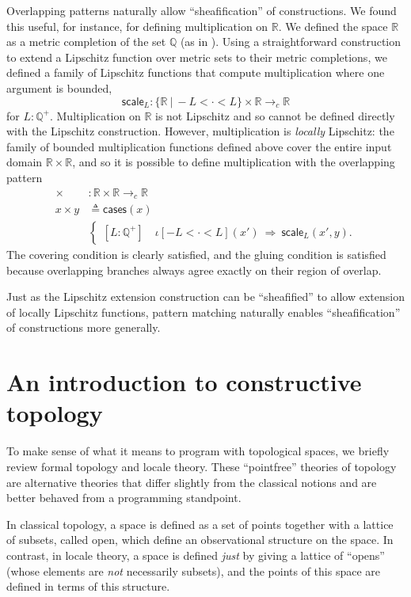 \documentclass[conference]{IEEEtran}
\newcommand{\cto}{\to_c}
\newcommand{\R}{\mathbb{R}}
\newcommand{\rat}{\mathbb{Q}}
\newcommand{\suchthat}{\ |\ }
\newcommand{\oinclf}[1]{\iota[{#1}]}
\newcommand{\oincl}[2]{\oinclf{#1} \left({#2}\right)}
\newcommand{\Branch}{\Rightarrow}
\begin{document}
Overlapping patterns naturally allow ``sheafification'' of constructions. We found this useful, for instance, for defining multiplication on $\R$. We defined the space $\R$ as a metric completion of the set $\rat$ (as in \cite{vickersmetric}). Using a straightforward construction to extend  a Lipschitz function over metric sets to their metric completions, we defined a family of Lipschitz functions that compute multiplication where one argument is bounded,
\[
\mathsf{scale}_L : \{ \R \suchthat -L < \cdot < L \} \times \R \cto \R
\]
for $L : \rat^+$. Multiplication on $\R$ is not Lipschitz and so cannot be defined directly with the Lipschitz construction. However, multiplication is \emph{locally} Lipschitz: the family of bounded multiplication functions defined above cover the entire input domain $\R \times \R$, and so it is possible to define multiplication with the overlapping pattern
\begin{align*}
\times &: \R \times \R \cto \R
\\ x \times y &\triangleq
\mathsf{cases}(x)
\\
&\begin{cases}
[L : \rat^+] \quad \oincl{-L < \cdot < L}{x'}  \  \Branch \  \mathsf{scale}_L(x', y).
\end{cases}
\end{align*}
The covering condition is clearly satisfied, and the gluing condition is satisfied because overlapping branches always agree exactly on their region of overlap.

Just as the Lipschitz extension construction can be ``sheafified'' to allow extension of locally Lipschitz functions, pattern matching naturally enables ``sheafification'' of constructions more generally.

\section{An introduction to constructive topology}
\label{s:topology}

To make sense of what it means to program with topological spaces, we briefly review formal topology and locale theory. These ``pointfree'' theories of topology are alternative theories that differ slightly from the classical notions and are better behaved from a programming standpoint.

In classical topology, a space is defined as a set of points together with a lattice of subsets, called open, which define an observational structure on the space. In contrast, in locale theory, a space is defined \emph{just} by giving a lattice of ``opens'' (whose elements are \emph{not} necessarily subsets), and the points of this space are defined in terms of this structure.
\end{document}
